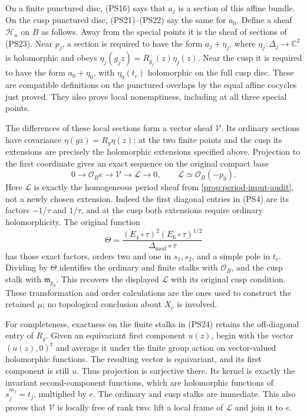 On a finite punctured disc, (PS16) says that $a_j$ is a section of
this affine bundle. On the cusp punctured disc, (PS21)--(PS22) say
the same for $a_0$. Define a sheaf $\mathscr H_n$ on $B$ as follows.
Away from the special points it is the sheaf of sections of (PS23).
Near $p_j$, a section is required to have the form $a_j+\eta_j$,
where $\eta_j:\Delta_j\to\mathbb C^2$ is holomorphic and obeys
$\eta_j(g_jz)=R_{g_j}(z)\eta_j(z)$. Near the cusp it is required
to have the form $a_0+\eta_0$, with $\eta_0(t_c)$ holomorphic on
the full cusp disc. These are compatible definitions on the punctured
overlaps by the equal affine cocycles just proved. They also prove
local nonemptiness, including at all three special points.

The differences of these local sections form a vector sheaf
$\mathscr V$. Its ordinary sections have covariance $\eta(gz)=R_g\eta(z)$;
at the two finite points and the cusp its extensions are precisely
the holomorphic extensions specified above. Projection to the first
coordinate gives an exact sequence on the original compact base
\[
 0\longrightarrow\mathcal O_B e\longrightarrow\mathscr V
        \longrightarrow\mathcal L\longrightarrow0,
                  \qquad \mathcal L\simeq\mathcal O_B(-p_0).
 \tag{PS24}\label{pshift:eq:vector-sheaf}
\]
Here $\mathcal L$ is exactly the homogeneous period sheaf from
\cref{prop:period-input-audit}, not a newly chosen extension. Indeed
the first diagonal entries in (PS4) are its factors $-1/\tau$ and
$1/\tau$, and at the cusp both extensions require ordinary
holomorphicity. The original function
\[
 \Theta=\frac{(E_4\circ\tau)^2(E_6\circ\tau)^{1/2}}
                 {\Delta_{\mathrm{mod}}\circ\tau}
\]
has those exact factors, orders two and one in $s_1,s_2$, and a
simple pole in $t_c$. Dividing by $\Theta$ identifies the ordinary
and finite stalks with $\mathcal O_B$, and the cusp stalk with
$\mathfrak m_{p_0}$. This recovers the displayed $\mathcal L$
with its original cusp condition. These transformation and order
calculations are the ones used to construct the retained $\mu$;
no topological conclusion about $X_c$ is involved.

For completeness, exactness on the finite stalks in (PS24) retains
the off-diagonal entry of $R_g$. Given an equivariant first component
$u(z)$, begin with the vector $(u(z),0)^{\mathsf t}$ and average it
under the finite group action on vector-valued holomorphic functions.
The resulting vector is equivariant, and its first component is
still $u$. Thus projection is surjective there. Its kernel is
exactly the invariant second-component functions, which are
holomorphic functions of $s_j^{m_j}=t_j$, multiplied by $e$.
The ordinary and cusp stalks are immediate. This also proves that
$\mathscr V$ is locally free of rank two: lift a local frame of
$\mathcal L$ and join it to $e$.

